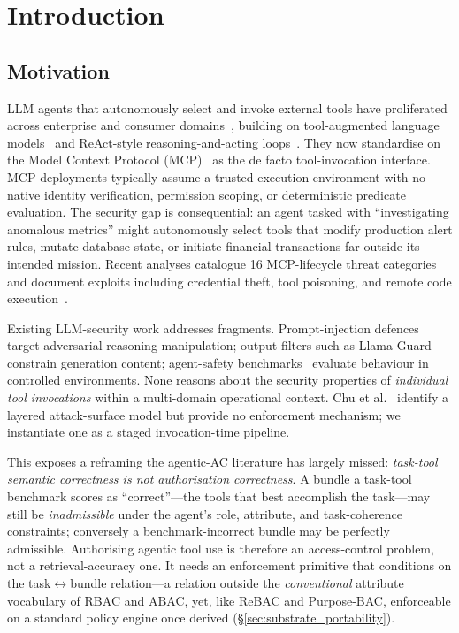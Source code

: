 \documentclass[sigconf,review,anonymous]{acmart}
\begin{document}
\section{Introduction}
\label{sec:introduction}

\subsection{Motivation}
\label{sec:motivation}

LLM agents that autonomously select and invoke external tools have proliferated across enterprise and consumer domains~\cite{wang2024survey, xi2025rise}, building on tool-augmented language models~\cite{schick2023toolformer} and ReAct-style reasoning-and-acting loops~\cite{yao2023react}. They now standardise on the Model Context Protocol (MCP)~\cite{anthropic2024mcp} as the de facto tool-invocation interface. MCP deployments typically assume a trusted execution environment with no native identity verification, permission scoping, or deterministic predicate evaluation. The security gap is consequential: an agent tasked with ``investigating anomalous metrics'' might autonomously select tools that modify production alert rules, mutate database state, or initiate financial transactions far outside its intended mission. Recent analyses catalogue 16 MCP-lifecycle threat categories~\cite{gupta2025security} and document exploits including credential theft, tool poisoning, and remote code execution~\cite{jamshidi2025securing}.

Existing LLM-security work addresses fragments. Prompt-injection defences~\cite{liu2024formalizing, zhan2024injecagent} target adversarial reasoning manipulation; output filters such as Llama Guard~\cite{inan2023llamaguard} constrain generation content; agent-safety benchmarks~\cite{zhang2024agentsafetybench, yuan2024rjudge} evaluate behaviour in controlled environments. None reasons about the security properties of \emph{individual tool invocations} within a multi-domain operational context. Chu et al.~\cite{chu2026stateless} identify a layered attack-surface model but provide no enforcement mechanism; we instantiate one as a staged invocation-time pipeline.

This exposes a reframing the agentic-AC literature has largely missed: \emph{task-tool semantic correctness is not authorisation correctness}. A bundle a task-tool benchmark scores as ``correct''---the tools that best accomplish the task---may still be \emph{inadmissible} under the agent's role, attribute, and task-coherence constraints; conversely a benchmark-incorrect bundle may be perfectly admissible. Authorising agentic tool use is therefore an access-control problem, not a retrieval-accuracy one. It needs an enforcement primitive that conditions on the task$\leftrightarrow$bundle relation---a relation outside the \emph{conventional} attribute vocabulary of RBAC and ABAC, yet, like ReBAC and Purpose-BAC, enforceable on a standard policy engine once derived (\S\ref{sec:substrate_portability}).
\end{document}
